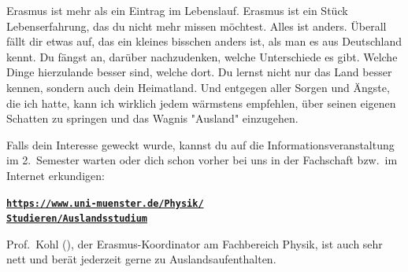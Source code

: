 \begin{multicols}{2}
Erasmus ist mehr als ein Eintrag im Lebenslauf.
Erasmus ist ein Stück Lebenserfahrung, das du nicht mehr missen möchtest.
Alles ist anders.
Überall fällt dir etwas auf, das ein kleines bisschen anders ist, als man es aus Deutschland kennt.
Du fängst an, darüber nachzudenken, welche Unterschiede es gibt.
Welche Dinge hierzulande besser sind, welche dort.
Du lernst nicht nur das Land besser kennen, sondern auch dein Heimatland.
Und entgegen aller Sorgen und Ängste, die ich hatte, kann ich wirklich jedem wärmstens empfehlen, über seinen eigenen Schatten zu springen und das Wagnis "Ausland" einzugehen.

Falls dein Interesse geweckt wurde, kannst du auf die Informationsveranstaltung im 2.~Semester warten oder dich schon vorher bei uns in der Fachschaft bzw.\ im Internet erkundigen:
\begin{center}
	\href{https://www.uni-muenster.de/Physik/Studieren/Auslandsstudium}{\textbf{\texttt{https://www.uni-muenster.de/Physik/\\Studieren/Auslandsstudium}}}
\end{center}

Prof.~Kohl (), der Erasmus-Koordinator am Fachbereich Physik, ist auch sehr nett und berät jederzeit gerne zu Auslandsaufenthalten.

\end{multicols}
